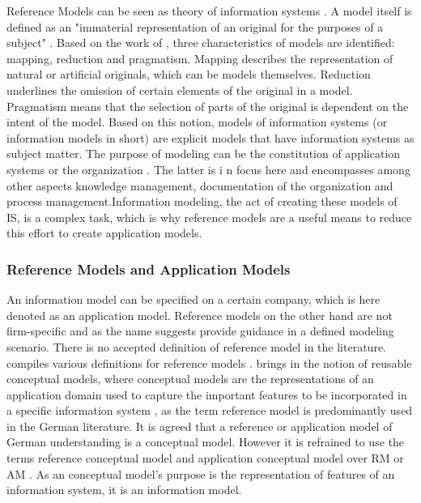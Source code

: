 		
		Reference Models can be seen as theory of information systems \cite{Schutte1998}. A model itself is defined as an "immaterial representation of an original for the purposes of a subject" \citep[]{Becker2012Gom}. Based on the work of \cite{Stachowiak1973}, three characteristics of models are identified: mapping, reduction and pragmatism. Mapping describes the representation of natural or artificial originals, which can be models themselves. Reduction underlines the omission of certain elements of the original in a model. Pragmatism means that the selection of parts of the original is dependent on the intent of the model. Based on this notion, models of information systems (or information models in short) are explicit models that have information systems as subject matter. The purpose of modeling can be the constitution of application systems or the organization \citep[]{Rosemann2012proc}. The latter is i n focus here and encompasses among other aspects knowledge management, documentation of the organization and process management.Information modeling, the act of creating these models of \acrshort{IS}, is a complex task, which is why reference models are a useful means to reduce this effort \cite{Becker2007} to create application models. 
			\subsubsection{Reference Models and Application Models}
			An information model can be specified on a certain company, which is here denoted as an application model. Reference models on the other hand are not firm-specific and as the name suggests provide guidance in a defined modeling scenario. There is no accepted definition of reference model in the literature. \citeauthor{thomas2006a} compiles various definitions for reference models \cite{thomas2006a}. \citeauthor{vom2006reusable} brings in the notion of reusable conceptual models, where conceptual models are the representations of an application domain used to capture the important features to be incorporated in a specific information system \citep[]{vom2006reusable}, as the term reference model is predominantly used in the German literature. It is agreed that a reference or application model of German understanding is a conceptual model. However it is refrained to use the terms reference conceptual model and application conceptual model over \acrfull{RM} or \acrfull{AM} . As an conceptual model's purpose is the representation of features of an information system, it is an information model. 
			
